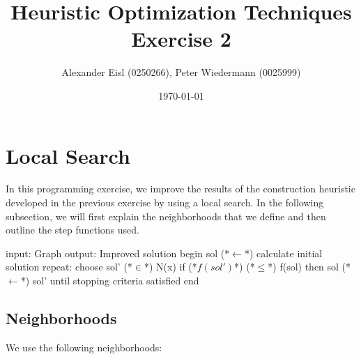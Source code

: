 \documentclass{scrartcl}
\author{Alexander Eisl (0250266), Peter Wiedermann (0025999)}
\date{\today}
\title{Heuristic Optimization Techniques \\ Exercise 2}
\begin{document}
\maketitle


\section{Local Search}
\label{sec:deterministic}
In this programming exercise, we improve the results of the
construction heuristic developed in the previous exercise by using a
local search. In the following subsection, we will first explain the
neighborhoods that we define and then outline the step functions used.

\begin{algorithm}[caption={Local search}]
    input: Graph 
    output: Improved solution
    begin
    	sol (*$\leftarrow$*) calculate initial solution
	repeat:
		choose sol' (*$\in$*) N(x) 
		if (*$f(sol')$*) (*$\leq$*) f(sol) then
			sol (*$\leftarrow$*) sol'
	until stopping criteria satisfied
    end
\end{algorithm}


\subsection{Neighborhoods}
\label{neighborhoods}
We use the following neighborhoods:
\end{document}

